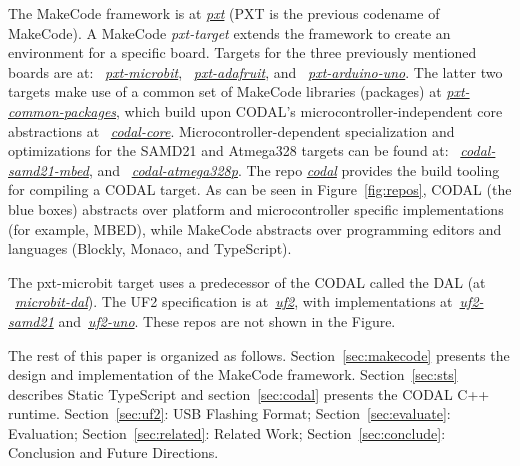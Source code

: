 The MakeCode framework 
is at \emph{\href{https://github.com/microsoft/pxt}{pxt}} (PXT is the previous codename of MakeCode). 
A MakeCode \emph{pxt-target} extends the framework to create an environment for a specific board. Targets
for the three previously mentioned boards are at: 
~\emph{\href{https://github.com/microsoft/pxt-microbit}{pxt-microbit}}, 
~\emph{\href{https://github.com/microsoft/pxt-adafruit}{pxt-adafruit}}, and
~\emph{\href{https://github.com/microsoft/pxt-arduino-uno}{pxt-arduino-uno}}.
The latter two targets make use of a common set of MakeCode libraries (packages) at
\emph{\href{https://github.com/microsoft/pxt-common-packages}{pxt-common-packages}},
which build upon CODAL's microcontroller-independent core abstractions at
~\emph{\href{https://github.com/lancaster-university/codal-core}{codal-core}}.  
Microcontroller-dependent specialization and optimizations for the SAMD21
and Atmega328 targets can be found at:
~\emph{\href{https://github.com/lancaster-university/codal-samd21-mbed}{codal-samd21-mbed}}, and
~\emph{\href{https://github.com/lancaster-university/codal-atmega328p}{codal-atmega328p}}.
The repo \emph{\href{https://github.com/lancaster-university/codal}{codal}} provides the
build tooling for compiling a CODAL target.  As can be seen in Figure~\ref{fig:repos}, 
CODAL (the blue boxes) abstracts over platform and microcontroller specific
implementations (for example, MBED), while MakeCode abstracts over programming editors
and languages (Blockly, Monaco, and TypeScript).

The pxt-microbit target uses a predecessor of the CODAL called the DAL (at
~\emph{\href{https://github.com/lancaster-university/microbit-dal}{microbit-dal}}).
The UF2 specification is at~\emph{\href{https://github.com/microsoft/uf2}{uf2}},
with implementations at~\emph{\href{https://github.com/microsoft/uf2-samd21}{uf2-samd21}}
and~\emph{\href{https://github.com/mmoskal/uf2-uno}{uf2-uno}}. These repos are not
shown in the Figure. 

The rest of this paper is organized as follows. Section~\ref{sec:makecode} presents the design and implementation of the MakeCode framework. 
Section~\ref{sec:sts} describes Static TypeScript and section~\ref{sec:codal} presents the CODAL C++ runtime. 
Section~\ref{sec:uf2}: USB Flashing Format;
Section~\ref{sec:evaluate}: Evaluation;
Section~\ref{sec:related}: Related Work;
Section~\ref{sec:conclude}: Conclusion and Future Directions. 
